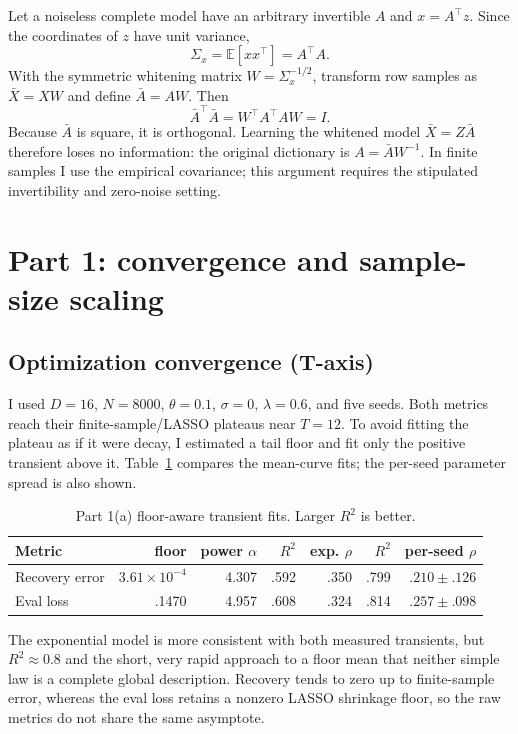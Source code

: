 \documentclass[11pt]{article}
\newcommand{\E}{\mathbb{E}}
\begin{document}
Let a noiseless complete model have an arbitrary invertible $A$ and
$x=A^\top z$.  Since the coordinates of $z$ have unit variance,
\[
 \Sigma_x=\E[xx^\top]=A^\top A.
\]
With the symmetric whitening matrix $W=\Sigma_x^{-1/2}$, transform row samples
as $\bar X=XW$ and define $\bar A=AW$.  Then
\[
 \bar A^\top\bar A=W^\top A^\top A W=I.
\]
Because $\bar A$ is square, it is orthogonal.  Learning the whitened model
$\bar X=Z\bar A$ therefore loses no information: the original dictionary is
$A=\bar A W^{-1}$.  In finite samples I use the empirical covariance; this
argument requires the stipulated invertibility and zero-noise setting.

\section{Part 1: convergence and sample-size scaling}

\subsection{Optimization convergence (T-axis)}

I used $D=16$, $N=8000$, $\theta=0.1$, $\sigma=0$, $\lambda=0.6$, and five
seeds.  Both metrics reach their finite-sample/LASSO plateaus near $T=12$.
To avoid fitting the plateau as if it were decay, I estimated a tail floor and
fit only the positive transient above it.  Table~\ref{tab:p1t} compares the
mean-curve fits; the per-seed parameter spread is also shown.

\begin{table}[H]
\centering
\caption{Part 1(a) floor-aware transient fits.  Larger $R^2$ is better.}
\label{tab:p1t}
\begin{tabular}{lrrrrrr}
\toprule
Metric & floor & power $\alpha$ & $R^2$ & exp. $\rho$ & $R^2$ & per-seed $\rho$ \\
\midrule
Recovery error & $3.61\!\times\!10^{-4}$ & 4.307 & .592 & .350 & .799 & $.210\pm.126$ \\
Eval loss      & .1470 & 4.957 & .608 & .324 & .814 & $.257\pm.098$ \\
\bottomrule
\end{tabular}
\end{table}

The exponential model is more consistent with both measured transients, but
$R^2\approx0.8$ and the short, very rapid approach to a floor mean that neither
simple law is a complete global description.  Recovery tends to zero up to
finite-sample error, whereas the eval loss retains a nonzero LASSO shrinkage
floor, so the raw metrics do not share the same asymptote.
\end{document}
